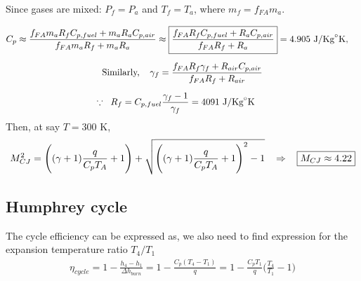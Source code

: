 \documentclass[a4paper,10pt]{article}
\begin{document}
Since gases are mixed: $P_f = P_a$ and $T_f = T_a$, where $m_f = f_{FA}m_a$.

\vspace*{-0.5cm}
\begin{gather*}
    C_p\approx\frac{f_{FA}m_aR_fC_{p,fuel}+m_aR_aC_{p,air}}{f_{FA}m_aR_f+m_aR_a}\approx\boxed{\frac{f_{FA}R_fC_{p,fuel}+R_aC_{p,air}}{f_{FA}R_f+R_a}} = 4.905\text{ J/Kg}^{\circ}\text{K},\hspace*{0.4cm}\\[0.2cm]
    \text{Similarly,}\hspace*{0.4cm}\gamma_f = \frac{f_{FA}R_f\gamma_f+R_{air}C_{p,air}}{f_{FA}R_f+R_{air}}\\[0.2cm]
    \because\hspace*{0.2cm}R_f = C_{p,fuel}\frac{\gamma_f-1}{\gamma_f} = 4091\text{ J/Kg}^{\circ}\text{K}\hspace*{0.5cm}
\end{gather*}
Then, at say $T = 300$ K,
\begin{gather*}
    M_{CJ}^2 = \Bigg((\gamma+1)\frac{q}{C_pT_A}+1\Bigg)+\sqrt{\Bigg((\gamma+1)\frac{q}{C_pT_A}+1\Bigg)^2-1}\hspace*{0.3cm}\Rightarrow\hspace*{0.3cm}\boxed{M_{CJ} \approx4.22}
\end{gather*}

\subsection{Humphrey cycle}
The cycle efficiency can be expressed as, we also need to find expression for the expansion temperature ratio $T_4/T_1$
\begin{gather*}
    \eta_{cycle} = 1-\frac{h_4-h_1}{\Delta h_{burn}}=1-\frac{C_p(T_4-T_1)}{q} = 1-\frac{C_pT_1}{q}\Bigg(\frac{T_4}{T_1}-1\Bigg)
\end{gather*}
\end{document}
